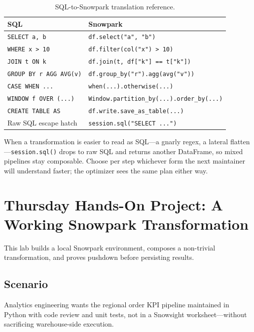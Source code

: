 \begin{table}[H]
\centering
\small
\begin{tabular}{@{}p{4.6cm}p{7.8cm}@{}}
\toprule
\textbf{SQL} & \textbf{Snowpark} \\
\midrule
\texttt{SELECT a, b} & \texttt{df.select("a", "b")} \\
\texttt{WHERE x > 10} & \texttt{df.filter(col("x") > 10)} \\
\texttt{JOIN t ON k} & \texttt{df.join(t, df["k"] == t["k"])} \\
\texttt{GROUP BY r AGG AVG(v)} & \texttt{df.group\_by("r").agg(avg("v"))} \\
\texttt{CASE WHEN ...} & \texttt{when(...).otherwise(...)} \\
\texttt{WINDOW f OVER (...)} & \texttt{Window.partition\_by(...).order\_by(...)} \\
\texttt{CREATE TABLE AS} & \texttt{df.write.save\_as\_table(...)} \\
Raw SQL escape hatch & \texttt{session.sql("SELECT ...")} \\
\bottomrule
\end{tabular}
\caption{SQL-to-Snowpark translation reference.}
\label{tab:chapter13-sql-mapping}
\end{table}

When a transformation is easier to read as SQL---a gnarly regex, a lateral flatten---\texttt{session.sql()} drops to raw SQL and returns another DataFrame, so mixed pipelines stay composable. Choose per step whichever form the next maintainer will understand faster; the optimizer sees the same plan either way.

\section{Thursday Hands-On Project: A Working Snowpark Transformation}
This lab builds a local Snowpark environment, composes a non-trivial transformation, and proves pushdown before persisting results.

\subsection*{Scenario}
Analytics engineering wants the regional order KPI pipeline maintained in Python with code review and unit tests, not in a Snowsight worksheet---without sacrificing warehouse-side execution.

